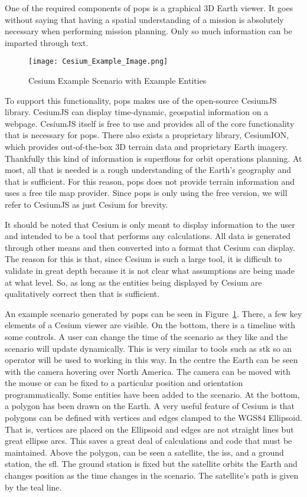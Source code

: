 One of the required components of \gls{pops} is a graphical 3D Earth viewer.
It goes without saying that having a spatial understanding of a mission is
absolutely necessary when performing mission planning. Only so much information
can be imparted through text.

\begin{figure}[h]
    \centering
    \texttt{[image: Cesium\_Example\_Image.png]} 
    \caption{Cesium Example Scenario with Example Entities}
    \label{fig:example_cesium}
\end{figure}

To support this functionality, \gls{pops} makes use of the open-source CesiumJS
library. CesiumJS can display time-dynamic, geospatial information on a
webpage. CesiumJS itself is free to use and provides all of the core
functionality that is necessary for \gls{pops}. There also exists a proprietary
library, CesiumION, which provides out-of-the-box 3D terrain data and
proprietary Earth imagery. Thankfully this kind of information is superflous
for orbit operations planning. At most, all that is needed is a rough
understanding of the Earth's geography and that is sufficient. For this reason,
\gls{pops} does not provide terrain information and uses a free tile map
provider. Since \gls{pops} is only using the free version, we will refer to
CesiumJS as just Cesium for brevity. 

It should be noted that Cesium is only meant to display information to the user
and intended to be a tool that performs any calculations. All data is generated
through other means and then converted into a format that Cesium can display.
The reason for this is that, since Cesium is such a large tool, it is difficult
to validate in great depth because it is not clear what assumptions are being
made at what level. So, as long as the entities being displayed by Cesium are
qualitatively correct then that is sufficient.

An example scenario generated by \gls{pops} can be seen in
Figure~\ref{fig:example_cesium}. There, a few key elements of a Cesium viewer
are visible. On the bottom, there is a timeline with some controls. A user can
change the time of the scenario as they like and the scenario will update
dynamically. This is very similar to tools such as \gls{stk} so an operator
will be used to working in this way. In the centre the Earth can be seen with
the camera hovering over North America.  The camera can be moved with the mouse
or can be fixed to a particular position and orientation programmatically.
Some entities have been added to the scenario. At the bottom, a polygon has
been drawn on the Earth. A very useful feature of Cesium is that polygons can
be defined with vertices and edges clamped to the WGS84 Ellipsoid. That is,
vertices are placed on the Ellipsoid and edges are not straight lines but great
ellipse arcs. This saves a great deal of calculations and code that must be
maintained. Above the polygon, can be seen a satellite, the \gls{iss}, and a
ground station, the \gls{sfl}. The ground station is fixed but the satellite
orbits the Earth and changes position as the time changes in the scenario. The
satellite's path is given by the teal line. 

